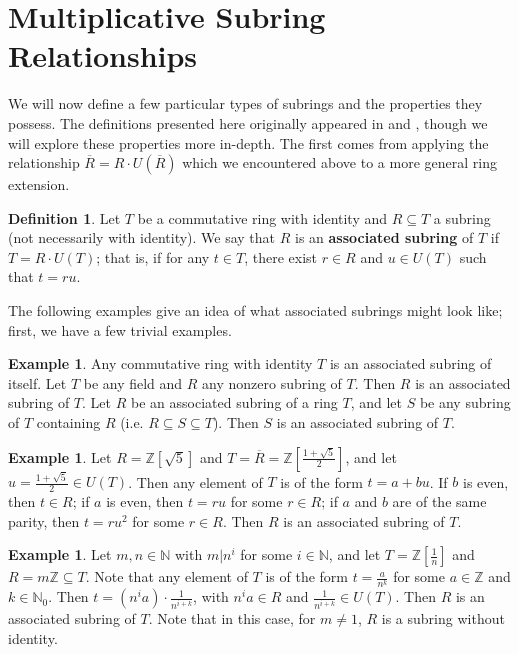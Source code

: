 \documentclass[12pt]{amsart}
\theoremstyle{definition}
\newtheorem{example}[theorem]{Example}
\newtheorem{definition}[theorem]{Definition}
\newcommand{\bZ}{\mathbb Z}
\newcommand{\bN}{\mathbb N}
\newcommand{\Rbar}{\overline{R}}
\newcommand{\term}[1]{\textbf{\textup{#1}}}
\begin{document}
	\section{Multiplicative Subring Relationships}
	We will now define a few particular types of subrings and the properties they possess. The definitions presented here originally appeared in \cite{dissertation} and \cite{radicalconductor}, though we will explore these properties more in-depth. The first comes from applying the relationship $\Rbar=R\cdot U(\Rbar)$ which we encountered above to a more general ring extension.
	\begin{definition}
		Let $T$ be a commutative ring with identity and $R\subseteq T$ a subring (not necessarily with identity). We say that $R$ is an \term{associated subring} of $T$ if $T=R\cdot U(T)$; that is, if for any $t\in T$, there exist $r\in R$ and $u\in U(T)$ such that $t=ru$.
	\end{definition}
	
	The following examples give an idea of what associated subrings might look like; first, we have a few trivial examples.
	
	\begin{example}
		Any commutative ring with identity $T$ is an associated subring of itself. Let $T$ be any field and $R$ any nonzero subring of $T$. Then $R$ is an associated subring of $T$. Let $R$ be an associated subring of a ring $T$, and let $S$ be any subring of $T$ containing $R$ (i.e. $R\subseteq S\subseteq T$). Then $S$ is an associated subring of $T$.
	\end{example}
	
	\begin{example}
		Let $R=\bZ[\sqrt{5}]$ and $T=\Rbar=\bZ[\frac{1+\sqrt{5}}{2}]$, and let $u=\frac{1+\sqrt{5}}{2}\in U(T)$. Then any element of $T$ is of the form $t=a+bu$. If $b$ is even, then $t\in R$; if $a$ is even, then $t=ru$ for some $r\in R$; if $a$ and $b$ are of the same parity, then $t=ru^2$ for some $r\in R$. Then $R$ is an associated subring of $T$.
	\end{example}
	
	\begin{example}
		Let $m,n\in\bN$ with $m|n^i$ for some $i\in\bN$, and let $T=\bZ[\frac{1}{n}]$ and $R=m\bZ\subseteq T$. Note that any element of $T$ is of the form $t=\frac{a}{n^k}$ for some $a\in\bZ$ and $k\in\bN_0$. Then $t=(n^ia)\cdot \frac{1}{n^{i+k}}$, with $n^ia\in R$ and $\frac{1}{n^{i+k}}\in U(T)$. Then $R$ is an associated subring of $T$. Note that in this case, for $m\neq 1$, $R$ is a subring without identity.
	\end{example}
	
\end{document}
